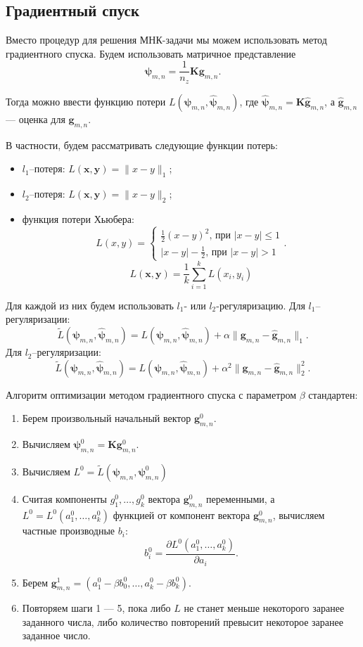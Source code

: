 \documentclass[../paper.tex]{subfiles}
\begin{document}
\subsection{Градиентный спуск}
Вместо процедур для решения МНК-задачи мы можем использовать метод градиентного
спуска. Будем использовать матричное представление
\[
	\bm{\psi}_{m,n} = \frac{1}{n_z} \bm{K} \bm{g}_{m,n}
.\]

Тогда можно ввести функцию потери $L(\bm{\psi}_{m,n}, \bm{\hat{\psi}}_{m,n})$,
где $\bm{\hat{\psi}}_{m,n} = \bm{K} \bm{\hat{g}}_{m,n}$, а $\bm{\hat{g}}_{m,n}$ ---
оценка для $\bm{g}_{m,n}$.

В частности, будем рассматривать следующие функции потерь:
\begin{itemize}
\item $l_1$--потеря: $L(\bm{x}, \bm{y}) = \| x - y \|_1$;
\item $l_2$--потеря: $L(\bm{x}, \bm{y}) = \| x - y \|_2$;
\item функция потери Хьюбера:
  \[
    L(x, y) =
    \begin{cases}
      \frac{1}{2} (x-y)^2 \text{, при $|x-y| \leqslant 1$} \\
      |x-y| - \frac{1}{2} \text{, при $|x-y| > 1$}
    \end{cases}.
  \]
  \[
    L(\bm{x}, \bm{y}) = \frac{1}{k} \sum_{i=1}^k L(x_i, y_i)
  \]
\end{itemize}

Для каждой из них будем использовать $l_1$- или $l_2$-регуляризацию. Для $l_1$--регуляризации:
\[
	\tilde{L}(\bm{\psi}_{m,n}, \bm{\hat{\psi}}_{m,n}) = L(\bm{\psi}_{m,n}, \bm{\hat{\psi}}_{m,n}) + \alpha \| \bm{g}_{m,n} - \bm{\hat{g}}_{m,n} \|_1
.\]
Для $l_2$--регуляризации:
\[
	\tilde{L}(\bm{\psi}_{m,n}, \bm{\hat{\psi}}_{m,n}) = L(\bm{\psi}_{m,n}, \bm{\hat{\psi}}_{m,n}) + \alpha^2 \| \bm{g}_{m,n} - \bm{\hat{g}}_{m,n} \|_2^2
.\]

Алгоритм оптимизации методом градиентного спуска с параметром $\beta$ стандартен:
\begin{enumerate}
	\item Берем произвольный начальный вектор $\bm{g}_{m,n}^0$.
	\item Вычисляем $\bm{\psi}_{m,n}^0 = \bm{K}\bm{g}_{m,n}^0$.
	\item Вычисляем $L^0 = \tilde{L}(\bm{\psi}_{m,n}, \bm{\psi}_{m,n}^0)$
	\item Считая компоненты $g_1^0, \dots, g_k^0$ вектора $\bm{g}_{m,n}^0$ переменными, 
		а $L^0 = L^0(a_1^0, \dots, a_k^0)$ функцией от компонент вектора $\bm{g}_{m,n}^0$, вычисляем частные производные $b_i$:
		\[
			b_i^0 = \frac{\partial L^0(a_1^0, \dots, a_k^0)}{\partial a_i}
		.\]
	\item Берем $\bm{g}_{m,n}^1 = (a_1^0 - \beta b_0^0, \dots, a_k^0 - \beta b_k^0)$.
	\item Повторяем шаги 1 --- 5, пока либо $L$ не станет меньше некоторого заранее заданного числа,
		либо количество повторений превысит некоторое заранее заданное число.
\end{enumerate}
\end{document}
